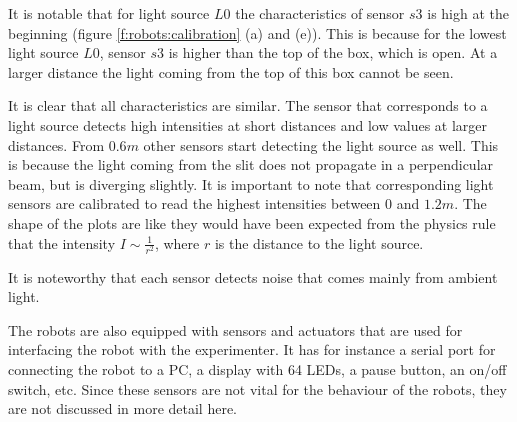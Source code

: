 \begin{description}
It is notable that for light source $L0$ the characteristics of sensor $s3$ is high at the beginning (figure \ref{f:robots:calibration} (a) and (e)). This is because for the lowest light source $L0$, sensor $s3$ is higher than the top of the box, which is open. At a larger distance the light coming from the top of this box cannot be seen. 

It is clear that all characteristics are similar. The sensor that corresponds to a light source detects high intensities at short distances and low values at larger distances. From $0.6 m$ other sensors start detecting the light source as well. This is because the light coming from the slit does not propagate in a perpendicular beam, but is diverging slightly. It is important to note that corresponding light sensors are calibrated to read the highest intensities between $0$ and $1.2 m$. The shape of the plots are like they would have been expected from the physics rule that the intensity $I \sim \frac{1}{r^2}$, where $r$ is the distance to the light source.

It is noteworthy that each sensor detects noise that comes mainly from ambient light.
\end{description}

The robots are also equipped with sensors and actuators that are used for interfacing the robot with the experimenter. It has for instance a serial port for connecting the robot to a PC, a display with 64 LEDs, a pause button, an on/off switch, etc. Since these sensors are not vital for the behaviour of the robots, they are not discussed in more detail here. 


